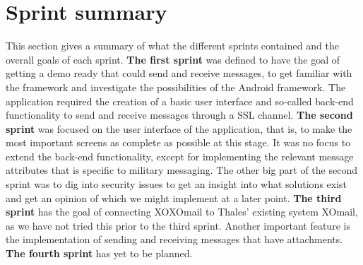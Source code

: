 \section{Sprint summary}

This section gives a summary of what the different sprints contained and the overall goals of each sprint. 
\newline
\newline
\textbf{The first sprint} was defined to have the goal of getting a demo ready that could send and receive messages, to get familiar with the framework and investigate the possibilities of the Android framework. The application required the creation of a basic user interface and so-called back-end functionality to send and receive messages through a SSL channel. 
\newline
\newline
\textbf{The second sprint} was focused on the user interface of the application, that is, to make the most important screens as complete as possible at this stage. It was no focus to extend the back-end functionality, except for implementing the relevant message attributes that is specific to military messaging. The other big part of the second sprint was to dig into security issues to get an insight into what solutions exist and get an opinion of which we might implement at a later point.
\newline
\newline
\textbf{The third sprint} has the goal of connecting XOXOmail to Thales’ existing system XOmail, as we have not tried this prior to the third sprint. Another important feature is the implementation of sending and receiving messages that have attachments.
\newline
\newline
\textbf{The fourth sprint} has yet to be planned.